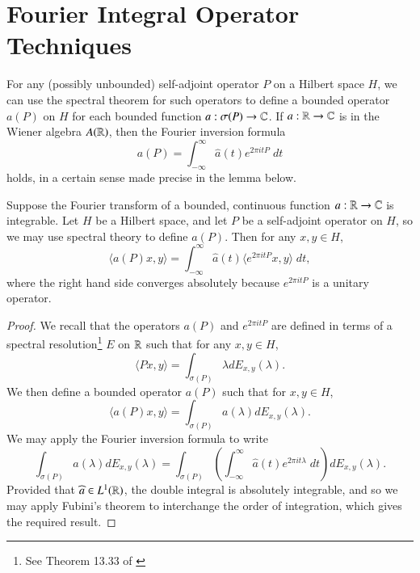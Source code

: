 \section{Fourier Integral Operator Techniques} \label{sec:FourierIntegral}

For any (possibly unbounded) self-adjoint operator $P$ on a Hilbert space $H$, we can use the spectral theorem for such operators to define a bounded operator $a(P)$ on $H$ for each bounded function $a: \sigma(P) \to \operatorname{\mathbb{C}}$. If $a: \operatorname{\mathbb{R}} \to \operatorname{\mathbb{C}}$ is in the Wiener algebra $A(\operatorname{\mathbb{R}})$, then the Fourier inversion formula
%
\begin{equation}
  a(P) = \int_{-\infty}^\infty \widehat{a}(t) e^{2 \pi i t P}\; dt
\end{equation}
%
holds, in a certain sense made precise in the lemma below.

\begin{lemma}
  Suppose the Fourier transform of a bounded, continuous function $a: \operatorname{\mathbb{R}} \to \operatorname{\mathbb{C}}$ is integrable. Let $H$ be a Hilbert space, and let $P$ be a self-adjoint operator on $H$, so we may use spectral theory to define $a(P)$. Then for any $x,y \in H$,
  \[ \langle a(P) x, y \rangle = \int_{-\infty}^\infty \widehat{a}(t) \langle e^{2 \pi i t P} x, y \rangle\; dt, \]
  where the right hand side converges absolutely because $e^{2 \pi i t P}$ is a unitary operator.
\end{lemma}
\begin{proof}
  We recall that the operators $a(P)$ and $e^{2 \pi i t P}$ are defined in terms of a spectral resolution\footnote{See Theorem 13.33 of \cite{RudinFunc}} $E$ on $\operatorname{\mathbb{R}}$ such that for any $x,y \in H$,
  \begin{equation}
    \langle Px, y \rangle = \int_{\sigma(P)} \lambda dE_{x,y}(\lambda).
  \end{equation}
  We then define a bounded operator $a(P)$ such that for $x,y \in H$,
  \begin{equation}
    \langle a(P) x, y \rangle = \int_{\sigma(P)} a(\lambda) dE_{x,y}(\lambda).
  \end{equation}
  We may apply the Fourier inversion formula to write
  \begin{equation}
    \int_{\sigma(P)} a(\lambda) dE_{x,y}(\lambda) = \int_{\sigma(P)} \left( \int_{-\infty}^\infty \widehat{a}(t) e^{2 \pi i t \lambda}\; dt \right) dE_{x,y}(\lambda).
  \end{equation}
%
Provided that $\widehat{a} \in L^1(\operatorname{\mathbb{R}})$, the double integral is absolutely integrable, and so we may apply Fubini's theorem to interchange the order of integration, which gives the required result.
\end{proof}

